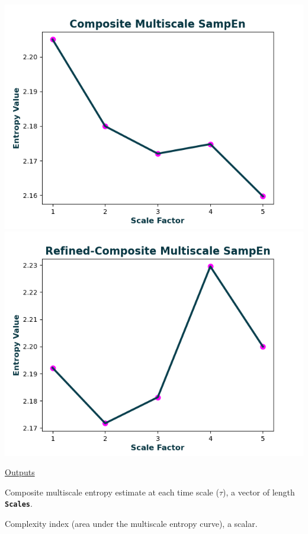 \documentclass[12pt, a4paper, titlepage, openany]{book}
\begin{document}
\begin{description}[labelsep=1cm, labelwidth=2cm, nosep, style=multiline,leftmargin=3cm]
							\includegraphics[scale=.7]{cMSEn1.png}\\
							\includegraphics[scale=.7]{rcMSEn1.png}
\end{description}

\noindent \ul{Outputs}
\begin{description}[labelsep=1cm, labelwidth=2cm, nosep, style=multiline,leftmargin=3cm]\footnotesize
\item[\texttt{MSx}]		Composite multiscale entropy estimate at each time scale ($\tau$), a vector of length 											\textbf{\texttt{Scales}}.
\item[\texttt{Ci}]		Complexity index (area under the multiscale entropy curve), a scalar.
\end{description}
\end{document}
